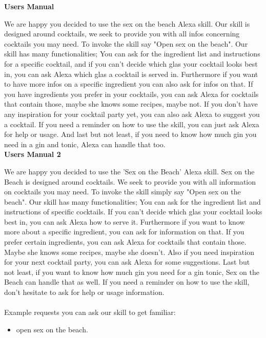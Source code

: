 \documentclass[12pt,letterpaper]{article}
\begin{document}
\begin{adjustwidth}{1cm}{1cm}
\textbf{Users Manual}

We are happy you decided to use the sex on the beach Alexa skill. Our skill is designed around cocktails, we seek to provide you with all infos concerning cocktails you may need. To invoke the skill say "Open sex on the beach".
Our skill has many functionalities; You can ask for the ingredient list and instructions for a specific cocktail, and if you can’t decide which glas your cocktail looks best in, you can ask Alexa which glas a cocktail is served in. Furthermore if you want to have more infos on a specific ingredient you can also ask for infos on that. If you have ingredients you prefer in your cocktails, you can ask Alexa for cocktails that contain those, maybe she knows some recipes, maybe not. If you don’t have any inspiration for your cocktail party yet, you can also ask Alexa to suggest you a cocktail.
If you need a reminder on how to use the skill, you can just ask Alexa for help or usage. And last but not least, if you need to know how much gin you need in a gin and tonic, Alexa can handle that too.
\\
\textbf{Users Manual 2} 

We are happy you decided to use the 'Sex on the Beach' Alexa skill. Sex on the Beach is designed around cocktails. We seek to provide you with all information on cocktails you may need. To invoke the skill simply say "Open sex on the beach".
Our skill has many functionalities; You can ask for the ingredient list and instructions of specific cocktails. If you can’t decide which glas your cocktail looks best in, you can ask Alexa how to serve it. Furthermore if you want to know more about a specific ingredient, you can ask for information on that. If you prefer certain ingredients, you can ask Alexa for cocktails that contain those. Maybe she knows some recipes, maybe she doesn't. Also if you need inspiration for your next cocktail party, you can ask Alexa for some suggestions. Last but not least, if you want to know how much gin you need for a gin tonic, Sex on the Beach can handle that as well.
If you need a reminder on how to use the skill, don't hesitate to ask for help or usage information. \\ \\
Example requests you can ask our skill to get familiar:
\begin{itemize}

\item open sex on the beach.


\end{itemize}
\end{adjustwidth}
\end{document}
